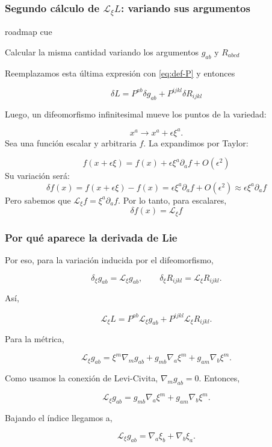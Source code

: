 \documentclass{beamer}
\newcommand{\Eq}[1]{\eqref{#1}}
\newcommand{\CompactDisplaySpacing}{%
  \setlength{\abovedisplayskip}{2pt plus 1pt minus 1pt}%
  \setlength{\belowdisplayskip}{2pt plus 1pt minus 1pt}%
  \setlength{\abovedisplayshortskip}{0pt plus 1pt}%
  \setlength{\belowdisplayshortskip}{1pt plus 1pt}%
}
\newcommand{\RoadmapCue}[1]{%
    \begin{beamercolorbox}[
        wd=\textwidth,
        sep=.55ex,
        leftskip=.8ex,
        rounded=true
    ]{roadmap cue}

    \scriptsize
    \enspace #1

    \end{beamercolorbox}

    \vspace{.25em}
}
\begin{document}
\begin{frame}[label=nav-frame-007]
\frametitle{Segundo cálculo de $\mathcal L_\xi L$: variando sus argumentos}
\linespread{.96}\selectfont\CompactDisplaySpacing
\RoadmapCue{
Calcular la misma cantidad variando los argumentos
$g_{ab}$ y $R_{abcd}$
}
\small

Reemplazamos esta última expresión con \Eq{eq:def-P} y entonces

\[
\boxed{
\delta L=P^{ab}\delta g_{ab}+P^{ijkl}\delta R_{ijkl}
}
\]

Luego, un difeomorfismo infinitesimal mueve los puntos de la variedad:

\[
x^a \longrightarrow x^a+\epsilon \xi^a.
\]
Sea una función escalar y arbitraria $f$. La expandimos por Taylor:

\[
f(x+\epsilon\xi) = f(x) + \epsilon \xi^a \partial_a f + O(\epsilon^2)
\]
Su variación será:
\[
\delta f(x) = f(x+\epsilon\xi) - f(x) = \epsilon \xi^a \partial_a f + O(\epsilon^2) \approx \epsilon \xi^a \partial_a f
\]
Pero sabemos que $\mathcal{L}_\xi f = \xi^a \partial_a f$. Por lo tanto, para escalares,
\[ \delta f(x) = \mathcal{L}_\xi f \]

\end{frame}

\begin{frame}[label=nav-frame-008]
\frametitle{Por qué aparece la derivada de Lie}
\small

Por eso, para la variación inducida por el difeomorfismo,

\[
\delta_\xi g_{ab}=\mathcal L_\xi g_{ab},
\qquad
\delta_\xi R_{ijkl}=\mathcal L_\xi R_{ijkl}.
\]

Así,

\begin{equation}
\boxed{
\mathcal L_\xi L
=
P^{ab}\mathcal L_\xi g_{ab}
+
P^{ijkl}\mathcal L_\xi R_{ijkl}.
}
\label{eq:lie-L-regla-cadena}
\end{equation}

Para la métrica,

\[
\mathcal L_\xi g_{ab}
=
\xi^m\nabla_mg_{ab}
+
g_{mb}\nabla_a\xi^m
+
g_{am}\nabla_b\xi^m.
\]

Como usamos la conexión de Levi-Civita, $\nabla_mg_{ab}=0$. Entonces,

\[
\mathcal L_\xi g_{ab}
=
g_{mb}\nabla_a\xi^m
+
g_{am}\nabla_b\xi^m.
\]

Bajando el índice llegamos a,

\begin{equation}
\boxed{
\mathcal L_\xi g_{ab}
=
\nabla_a\xi_b+\nabla_b\xi_a.
}
\label{eq:lie-metrica}
\end{equation}

\end{frame}
\end{document}
